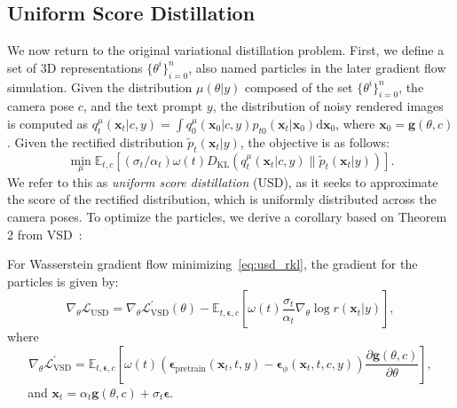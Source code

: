\subsection{Uniform Score Distillation}\label{method:usd}


We now return to the original variational distillation problem. First, we define a set of 3D representations $\{\theta^i\}_{i=0}^n$, also named particles in the later gradient flow simulation. Given the distribution $\mu(\theta|y)$ composed of the set $\{\theta^i\}_{i=0}^n$, the camera pose $c$, and the text prompt $y$, the distribution of noisy rendered images is computed as $q_t^\mu(\boldsymbol{x}_t|c,y) = \int q_0^\mu(\boldsymbol{x}_0|c,y)p_{t0}(\boldsymbol{x}_t|\boldsymbol{x}_0)\mathrm{d}\boldsymbol{x}_0$, where $\boldsymbol{x}_0=\boldsymbol{g}(\theta,c)$. Given the rectified distribution $\tilde{p}_t(\boldsymbol{x}_t|y)$, the objective is as follows:
\begin{equation}\label{eq:usd_rkl}
 \min_\mu \mathbb{E}_{t,c}\left[(\sigma_t/\alpha_t)\omega(t)D_{\mathrm{KL}}(q_t^\mu(\boldsymbol{x}_t|c,y)\parallel \tilde{p}_t(\boldsymbol{x}_t|y))\right].
\end{equation}
We refer to this as \textit{uniform score distillation} (USD), as it seeks to approximate the score of the rectified distribution, which is uniformly distributed across the camera poses. To optimize the particles, we derive a corollary based on Theorem 2 from VSD~\citep{wang2024prolificdreamer}:
\begin{corollary}\label{cr:usd_gradient}
 For Wasserstein gradient flow minimizing~\eqref{eq:usd_rkl}, the gradient for the particles is given by:
    \begin{equation}\label{eq:usd_grad}
        \nabla_\theta\mathcal{L}_\text{USD} = \nabla_\theta \mathcal{L}_\text{VSD}^\prime(\theta) - \mathbb{E}_{t,\boldsymbol{\epsilon},c}\left[\omega(t)\frac{\sigma_t}{\alpha_t}\nabla_{\theta}\log r(\boldsymbol{x}_t|y)\right],
    \end{equation}
 where
    \begin{equation}
        \nabla_\theta\mathcal{L}_\text{VSD}^\prime = \mathbb{E}_{t,\boldsymbol{\epsilon},c}\left[\omega(t)\left(\boldsymbol{\epsilon}_\text{pretrain}(\boldsymbol{x}_t,t,y)-\boldsymbol{\epsilon}_\phi(\boldsymbol{x}_t,t,c,y)\right)\frac{\partial\boldsymbol{g}(\theta,c)}{\partial\theta}\right],
    \end{equation}    
 and $\boldsymbol{x}_t=\alpha_t\boldsymbol{g}(\theta,c)+\sigma_t\boldsymbol{\epsilon}$.
\end{corollary}




